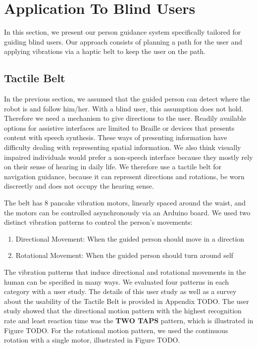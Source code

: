 \documentclass[12pt]{gatech-thesis}
\begin{document}
\section{Application To Blind Users}

In this section, we present our person guidance system specifically tailored for guiding blind users. Our approach consists of planning a path for the user and applying vibrations via a haptic belt to keep the user on the path.


\subsection{Tactile Belt}

In the previous section, we assumed that the guided person can detect where the robot is and follow him/her. With a blind user, this assumption does not hold. Therefore we need a mechanism to give directions to the user. Readily available options for assistive interfaces are limited to Braille or devices that presents content with speech synthesis. These ways of presenting information have difficulty dealing with representing spatial information. We also think visually impaired individuals would prefer a non-speech interface because they mostly rely on their sense of hearing in daily life. We therefore use a tactile belt for navigation guidance, because it can represent directions and rotations, be worn discreetly and does not occupy the hearing sense.

The belt has 8 pancake vibration motors, linearly spaced around the waist, and the motors can be controlled asynchronously via an Arduino board. We used two distinct vibration patterns to control the person's movements:

\begin{enumerate}
\item Directional Movement: When the guided person should move in a direction
\item Rotational Movement: When the guided person should turn around self
\end{enumerate}

The vibration patterns that induce directional and rotational movements in the human can be specified in many ways. We evaluated four patterns in each category with a user study. The details of this user study as well as a survey about the usability of the Tactile Belt is provided in Appendix TODO. The user study showed that the directional motion pattern with the highest recognition rate and least reaction time was the \textbf{TWO TAPS} pattern, which is illustrated in Figure TODO. For the rotational motion pattern, we used the continuous rotation with a single motor, illustrated in Figure TODO. 
\end{document}
